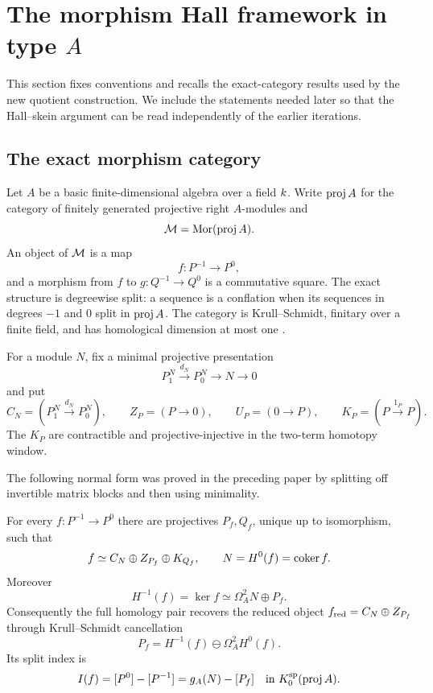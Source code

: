 \section{The morphism Hall framework in type $A$}
\label{sec:prior}

This section fixes conventions and recalls the exact-category results used by
the new quotient construction.  We include the statements needed later so
that the Hall--skein argument can be read independently of the earlier
iterations.

\subsection{The exact morphism category}

Let $A$ be a basic finite-dimensional algebra over a field $k$.  Write
$\operatorname{proj} A$ for the category of finitely generated projective right $A$-modules
and
\[
 \mathcal M=\operatorname{Mor}(\operatorname{proj} A).
\]
An object of $\mathcal M$ is a map
\[
 f:P^{-1}\longrightarrow P^0,
\]
and a morphism from $f$ to $g:Q^{-1}\to Q^0$ is a commutative square.  The
exact structure is degreewise split: a sequence is a conflation when its
sequences in degrees $-1$ and $0$ split in $\operatorname{proj} A$.  The category is
Krull--Schmidt, finitary over a finite field, and has homological dimension at
most one \cite{Bautista,Li}.

For a module $N$, fix a minimal projective presentation
\[
 P_1^N\xrightarrow{d_N}P_0^N\longrightarrow N\longrightarrow0
\]
and put
\[
 C_N=(P_1^N\xrightarrow{d_N}P_0^N),
 \qquad
 Z_P=(P\longrightarrow0),
 \qquad
 U_P=(0\longrightarrow P),
 \qquad
 K_P=(P\xrightarrow{1_P}P).
\]
The $K_P$ are contractible and projective-injective in the two-term homotopy
window.

The following normal form was proved in the preceding paper by splitting off
invertible matrix blocks and then using minimality.

\begin{theorem}
\label{thm:normal-form}
For every $f:P^{-1}\to P^0$ there are projectives $P_f,Q_f$, unique up to
isomorphism, such that
\begin{equation}
 f\simeq C_N\oplus Z_{P_f}\oplus K_{Q_f},
 \qquad N=H^0(f)=\operatorname{coker} f.
 \label{eq:normal-form}
\end{equation}
Moreover
\begin{equation}
 H^{-1}(f)=\ker f\simeq\Omega_A^2N\oplus P_f.
 \label{eq:homology-residue}
\end{equation}
Consequently the full homology pair recovers the reduced object
$f_{\rm red}=C_N\oplus Z_{P_f}$ through Krull--Schmidt cancellation
\[
 P_f=H^{-1}(f)\ominus\Omega_A^2H^0(f).
\]
Its split index is
\begin{equation}
 I(f)=[P^0]-[P^{-1}]
     =g_A(N)-[P_f]
 \quad\text{in }K_0^{\rm sp}(\operatorname{proj} A).
 \label{eq:split-index}
\end{equation}
\end{theorem}

